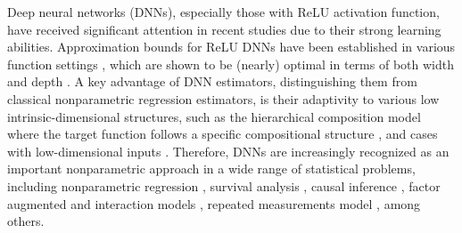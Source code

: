 Deep neural networks (DNNs), especially those with ReLU activation function, have received significant attention in recent studies due to their strong learning abilities. 
Approximation bounds for ReLU DNNs have been established in various function settings \citep{yarotsky2017error,yarotsky2018optimal, schmidtaos,suzuki2018adaptivity,yarotsky2020phase,kohler2021rate}, which are shown to be (nearly) optimal in terms of both width and depth \citep{shen2020,lu2021deep,shen2022optimal}. 
A key advantage of DNN estimators, distinguishing them from classical nonparametric regression estimators, is their adaptivity to various low intrinsic-dimensional structures, such as the hierarchical composition model where the target function follows a specific compositional structure \citep{bauer2019deep, schmidtaos, kohler2021rate}, and cases with low-dimensional inputs  \citep{schmidt2019deep,chen2019nonparametric,cloninger2021deep,nakada2020adaptive,huangjian}. 
Therefore, DNNs are increasingly recognized as an important nonparametric approach in a wide range of statistical problems, including nonparametric regression \citep{bauer2019deep,schmidtaos,suzuki2018adaptivity,kohler2021rate, wang2024deep}, survival analysis \citep{deephazard,deepcox}, causal inference \citep{farrell2021deep,chen2024causal}, factor augmented and interaction models \citep{fan2022factor,bhattacharya2023deep},
repeated measurements model \citep{yan2023nonparametricregressionrepeatedmeasurements}, among others. 


